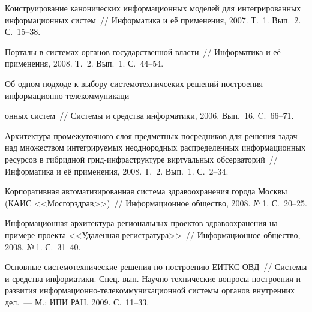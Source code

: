 \begin{multicols}{2}
{{\begin{thebibliography}{9}
Конструирование канонических информационных моделей для интегрированных 
информационных систем~// Информатика и её применения, 2007. Т.~1. Вып.~2. С.~15--38.

Порталы в системах органов государственной власти~// Информатика и её применения, 
2008. Т.~2. Вып.~1. С.~44--54.

Об одном подходе к выбору системотехничсеких решений построения 
информационно-те\-ле\-ком\-му\-ни\-ка\-ци-\linebreak\vspace*{-12pt}
\pagebreak

\noindent
он\-ных систем~// Системы и средства информатики, 2006. 
Вып.~16. C.~66--71.

Архитектура промежуточного слоя предметных посредников для решения задач над 
множеством интегрируемых неоднородных распределенных информационных ресурсов в 
гибридной грид-инфраструктуре виртуальных обсерваторий~// Информатика и её 
применения, 2008. Т.~2. Вып.~1. С.~2--34. 

 Корпоративная автоматизированная сис\-те\-ма здравоохранения города Москвы (КАИС 
<<Мосгорздрав>>)~// Информационное общество, 2008. №\,1. С.~20--25.

Информационная архитектура региональных проектов здравоохранения на примере проекта 
<<Удаленная регистратура>>~// Информационное общество, 2008. №\,1. С.~31--40.



\label{end\stat}

Основные сис\-те\-мо\-тех\-ни\-ческие решения по построению ЕИТКС ОВД~// Системы и 
средства информатики. Спец. вып. На\-уч\-но-тех\-ни\-че\-ские вопросы построения и развития 
ин\-фор\-ма\-ци\-он\-но-те\-ле\-ком\-му\-ни\-ка\-ци\-он\-ной сис\-те\-мы органов внутренних дел.~--- М.: ИПИ 
РАН, 2009. С.~11--33.
       
 \end{thebibliography}
}
}
\end{multicols}
